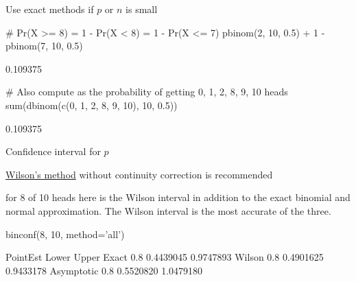 \item Use exact methods if $p$ or $n$ is small
\begin{Schunk}
\begin{Sinput}
# Pr(X >= 8) = 1 - Pr(X < 8) = 1 - Pr(X <= 7)
pbinom(2, 10, 0.5) + 1 - pbinom(7, 10, 0.5)
\end{Sinput}
\begin{Soutput}
[1] 0.109375
\end{Soutput}
\begin{Sinput}
# Also compute as the probability of getting 0, 1, 2, 8, 9, 10 heads
sum(dbinom(c(0, 1, 2, 8, 9, 10), 10, 0.5))
\end{Sinput}
\begin{Soutput}
[1] 0.109375
\end{Soutput}
\end{Schunk}
\item Confidence interval for $p$
  \bi
  \item
    \href{https://en.wikipedia.org/wiki/Binomial_proportion_confidence_interval}{Wilson's
      method} without continuity correction is recommended
  \item for 8 of 10 heads here is the Wilson interval in addition to
    the exact binomial and normal approximation.  The Wilson interval
    is the most accurate of the three.
  \ei
  
\begin{Schunk}
\begin{Sinput}
binconf(8, 10, method='all')
\end{Sinput}
\begin{Soutput}
           PointEst     Lower     Upper
Exact           0.8 0.4439045 0.9747893
Wilson          0.8 0.4901625 0.9433178
Asymptotic      0.8 0.5520820 1.0479180
\end{Soutput}
\end{Schunk}
\ei

